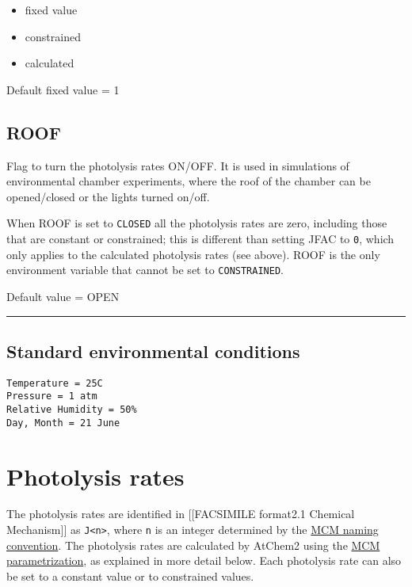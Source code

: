 \begin{itemize}
\item
  fixed value
\item
  constrained
\item
  calculated
\end{itemize}

Default fixed value = 1

\subsection{ROOF} \label{roof}

Flag to turn the photolysis rates ON/OFF. It is used in simulations of
environmental chamber experiments, where the roof of the chamber can be
opened/closed or the lights turned on/off.

When ROOF is set to \texttt{CLOSED} all the photolysis rates are zero,
including those that are constant or constrained; this is different than
setting JFAC to \texttt{0}, which only applies to the calculated
photolysis rates (see above). ROOF is the only environment variable that
cannot be set to \texttt{CONSTRAINED}.

Default value = OPEN

\begin{center}\rule{0.5\linewidth}{\linethickness}\end{center}

\subsection{Standard environmental conditions} \label{standard-environmental-conditions}

\begin{verbatim}
Temperature = 25C  
Pressure = 1 atm  
Relative Humidity = 50%  
Day, Month = 21 June
\end{verbatim}

\section{Photolysis rates} \label{sec:photolysis}

The photolysis rates are identified in {[}{[}FACSIMILE
format\textbar{}2.1 Chemical Mechanism{]}{]} as
\texttt{J\textless{}n\textgreater{}}, where \texttt{n} is an integer
determined by the
\href{http://mcm.leeds.ac.uk/MCMv3.3.1/parameters/photolysis.htt}{MCM
naming convention}. The photolysis rates are calculated by AtChem2 using
the
\href{http://mcm.leeds.ac.uk/MCM/parameters/photolysis_param.htt}{MCM
parametrization}, as explained in more detail below. Each photolysis
rate can also be set to a constant value or to constrained values.

